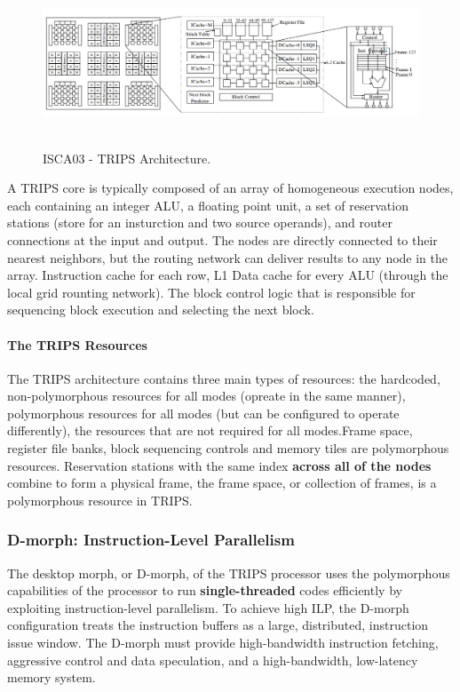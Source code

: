 \documentclass[UTF8,12pt,a4paper]{article}
\begin{document}
\begin{figure}[htb]
  \begin{small}
    \begin{center}
      \includegraphics[width=\textwidth,height=5cm]{figures/isca03_trips_arch.png}
    \end{center}
    \caption{ISCA03 - TRIPS Architecture.}
    \label{fig:trips_arch}
  \end{small}
\end{figure}

A TRIPS core is typically composed of an array of homogeneous execution nodes,
each containing an integer ALU, a floating point unit, a set of reservation stations
(store for an insturction and two source operands), and router connections at the input and output.
The nodes are directly connected to their nearest neighbors,
but the routing network can deliver results to any node in the array.
Instruction cache for each row, L1 Data cache for every ALU (through the local grid rounting network).
The block control logic that is responsible for sequencing block execution and selecting the next block.

\paragraph{The TRIPS Resources}
The TRIPS architecture contains three main types of resources: 
the hardcoded, non-polymorphous resources for all modes (opreate in the same manner),
polymorphous resources for all modes (but can be configured to operate differently),
the resources that are not required for all modes.Frame space, register file banks,
block sequencing controls and memory tiles are polymorphous resources.
Reservation stations with the same index \textbf{across all of the nodes} combine to form a physical frame,
the frame space, or collection of frames, is a polymorphous resource in TRIPS.

\subsubsection{D-morph: Instruction-Level Parallelism}
The desktop morph, or D-morph, of the TRIPS processor
uses the polymorphous capabilities of the processor
to run \textbf{single-threaded} codes efficiently by exploiting
instruction-level parallelism.
To achieve high ILP, the D-morph configuration treats
the instruction buffers as a large, distributed, instruction issue window.
The D-morph must provide high-bandwidth instruction fetching,
aggressive control and data speculation, and a high-bandwidth, low-latency memory system.
\end{document}
